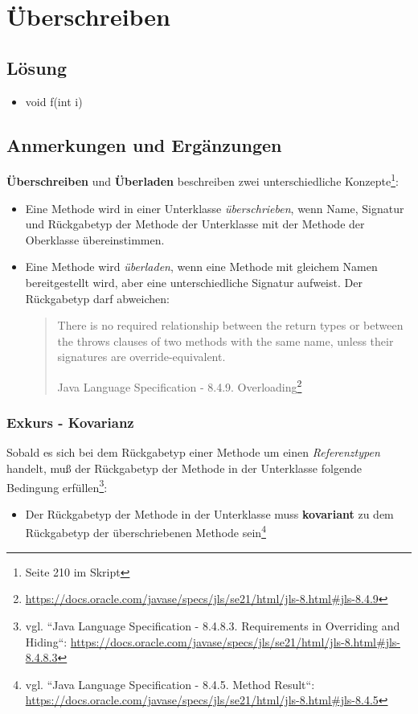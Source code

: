 \chapter{Überschreiben}

\section*{Lösung}

\begin{itemize}
    \item void f(int i)
\end{itemize}


\section*{Anmerkungen und Ergänzungen}

\textbf{Überschreiben} und \textbf{Überladen} beschreiben zwei unterschiedliche Konzepte\footnote{Seite 210 im Skript}:

\begin{itemize}
    \item Eine Methode wird in einer Unterklasse \textit{überschrieben}, wenn Name, Signatur und Rückgabetyp der Methode der Unterklasse mit der
    Methode der Oberklasse übereinstimmen.
    \item Eine Methode wird \textit{überladen}, wenn eine Methode mit gleichem Namen bereitgestellt wird, aber eine unterschiedliche Signatur
    aufweist.
    Der Rückgabetyp darf abweichen:
    \blockquote[Java Language Specification - 8.4.9. Overloading\footnote{\url{https://docs.oracle.com/javase/specs/jls/se21/html/jls-8.html#jls-8.4.9}}]{
        There is no required relationship between the return types or between the throws clauses of two methods with the same name, unless their signatures are override-equivalent.
    }
\end{itemize}

\subsection*{Exkurs - Kovarianz}
Sobald es sich bei dem Rückgabetyp einer Methode um einen \textit{Referenztypen} handelt, muß der Rückgabetyp der Methode in der Unterklasse
folgende Bedingung erfüllen\footnote{
vgl. ``Java Language Specification - 8.4.8.3. Requirements in Overriding and Hiding``: \url{https://docs.oracle.com/javase/specs/jls/se21/html/jls-8.html#jls-8.4.8.3}
}:

\begin{itemize}
    \item Der Rückgabetyp der Methode in der Unterklasse muss \textbf{kovariant} zu dem Rückgabetyp der überschriebenen Methode sein\footnote{
        vgl. ``Java Language Specification - 8.4.5. Method Result``: \url{https://docs.oracle.com/javase/specs/jls/se21/html/jls-8.html#jls-8.4.5}
    }
\end{itemize}

